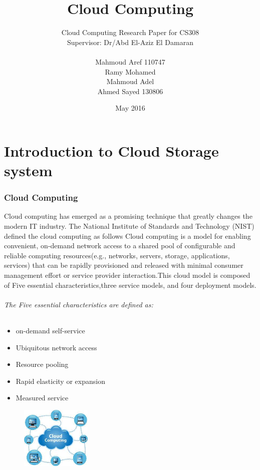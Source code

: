 \documentclass[11pt,a4paper]{report}
\begin{document}
\title{Cloud Computing}
\author{Cloud Computing Research Paper for CS308 \\Supervisor: Dr/Abd El-Aziz El Damaran \\
\\Mahmoud Aref 110747\\Ramy Mohamed\\Mahmoud Adel\\Ahmed Sayed 130806}
\date{May 2016}
\maketitle
\chapter{Introduction to Cloud Storage system}

\subsection{Cloud Computing}

Cloud computing has emerged as a promising technique that greatly changes the modern IT industry. The National Institute of Standards and Technology (NIST) defined the cloud computing as follows  Cloud computing is a model for enabling convenient, on-demand network access to a shared pool of configurable and reliable computing resources(e.g., networks, servers, storage, applications, services) that can be rapidly provisioned and released with minimal consumer management effort or service provider interaction.This cloud model is composed of Five essential characteristics,three service models, and four deployment models.

\subparagraph*{The Five essential characteristics are defined as:}
\begin{itemize} 
\item on-demand self-service
\item Ubiquitous network access
\item Resource pooling
\item Rapid elasticity or expansion 
\item Measured service 
\end{itemize}
\begin{figure}
\centering
\includegraphics[width=0.3\textwidth]{4.jpg}
\caption{\label{Cloud Computing}}
\end{figure}
\end{document}
